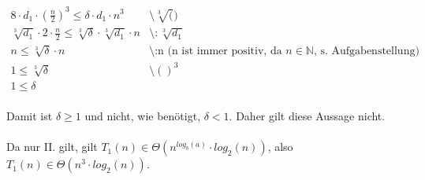 \documentclass{article}
\begin{document}
\begin{enumerate}
\[\begin{array}{lll}
   	            8 \cdot d_1\cdot (\frac{n}{2})^3 \leq \delta \cdot d_1\cdot n^3 &\text{\textbackslash $\sqrt[3]()$}\\
   	            \sqrt[3]{d_1}\cdot 2 \cdot \frac{n}{2} \leq \sqrt[3]{\delta}\cdot \sqrt[3]{d_1} \cdot n & \text{\textbackslash $:\sqrt[3]{d_1}$}\\
   	            n \leq \sqrt[3]{\delta} \cdot n &\text{\textbackslash :n    (n ist immer positiv, da $n \in \mathbb{N}$, s. Aufgabenstellung)}\\
   	            1 \leq \sqrt[3]{\delta} &\text{\textbackslash $()^3$}\\
   	            1 \leq \delta
   	        \end{array}
   	    \]
   	    \\
   	    Damit ist $\delta \geq 1$ und nicht, wie benötigt, $\delta < 1$. Daher gilt diese Aussage nicht.
   	    \\\\
   	    Da nur II. gilt, gilt $T_1(n) \in \Theta (n^{log_b(a)} \cdot log_2(n))$, also $T_1(n) \in \Theta (n^3 \cdot log_2(n))$.
   	\end{enumerate}
   	
\end{document}

